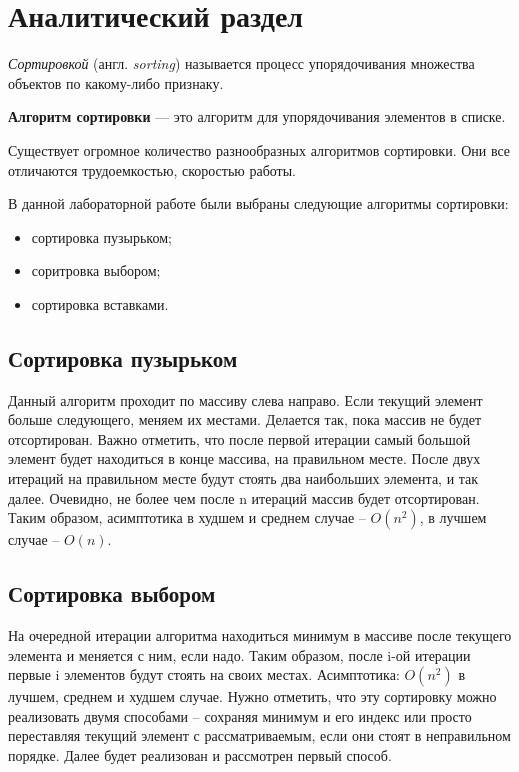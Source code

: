 \chapter{Аналитический раздел}

\textit{Сортировкой} (англ. \textit{sorting}) называется процесс упорядочивания множества объектов по какому-либо признаку.

\textbf{Алгоритм сортировки} — это алгоритм для упорядочивания элементов в списке.

Существует огромное количество разнообразных алгоритмов сортировки. Они все отличаются трудоемкостью, скоростью работы.

В данной лабораторной работе были выбраны следующие алгоритмы сортировки:

\begin{itemize}
	\item сортировка пузырьком;
	\item соритровка выбором;
	\item сортировка вставками.
\end{itemize}

\section{Сортировка пузырьком}
Данный алгоритм проходит по массиву слева направо. Если текущий элемент больше следующего, меняем их местами. Делается так, пока массив не будет отсортирован. Важно отметить, что после первой итерации самый большой элемент будет находиться в конце массива, на правильном месте. После двух итераций на правильном месте будут стоять два наибольших элемента, и так далее. Очевидно, не более чем после n итераций массив будет отсортирован. Таким образом, асимптотика в худшем и среднем случае – $O(n^2)$, в лучшем случае – $O(n)$. \cite{teoriya}

\section{Сортировка выбором}
На очередной итерации алгоритма находиться минимум в массиве после текущего элемента и меняется с ним, если надо. Таким образом, после i-ой итерации первые i элементов будут стоять на своих местах. Асимптотика: $O(n^2)$ в лучшем, среднем и худшем случае. Нужно отметить, что эту сортировку можно реализовать двумя способами – сохраняя минимум и его индекс или просто переставляя текущий элемент с рассматриваемым, если они стоят в неправильном порядке. Далее будет реализован и рассмотрен первый способ. \cite{teoriya}


